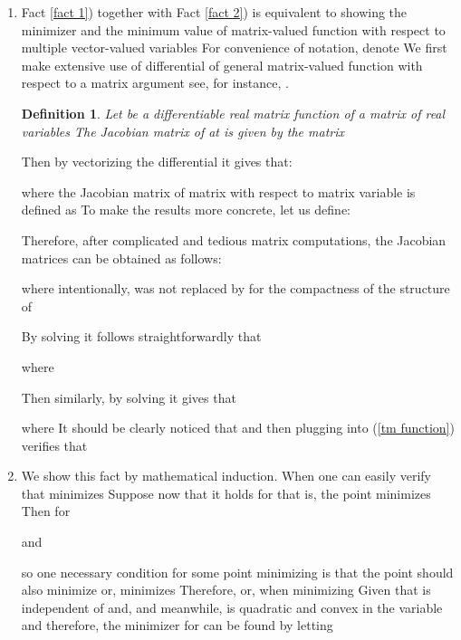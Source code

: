 \documentclass[journal]{IEEEtran}
\newtheorem{definition}{Definition}
\begin{document}
\begin{IEEEproof}



\begin{enumerate}
\item\label{proof1} Fact \ref{fact 1}) together with Fact \ref{fact 2}) is equivalent to showing the minimizer and the minimum value of matrix-valued function  with respect to multiple vector-valued variables  For convenience of notation, denote  We first make extensive use of differential of general matrix-valued function  with respect to a matrix argument  see, for instance, \cite{tif2009payaro}. \newline
    \begin{definition}
    Let  be a differentiable  real matrix function of a  matrix of real variables  The {\emph{Jacobian matrix}} of  at  is given by the  matrix
    
    \end{definition}

    \iffalse With slightly abuse of notation, we omit the notation  for brevity. For example, let  \fi
    Then by vectorizing the differential  it gives that:
    
    where the Jacobian matrix of matrix  with respect to matrix variable  is defined as   To make the results more concrete, let us define:
    
Therefore, after complicated and tedious matrix computations, the Jacobian matrices can be obtained as follows:
    
    where intentionally,  was not replaced by  for the compactness of the structure of 

    By solving  it follows straightforwardly that
    
    where 

    Then similarly, by solving  it gives that
    
    where  It should be clearly noticed that   and then plugging  into
    (\ref{tm function}) verifies that 

    \item We show this fact by mathematical induction. When  one can easily verify that  minimizes 
        Suppose now that it holds for  that is, the point  minimizes  Then for 
    
    and
    
    so one necessary condition for some point  minimizing  is that the point should also minimize 
    or,  minimizes  Therefore,  or,  when minimizing  Given that  is independent of  and,  and meanwhile,  is quadratic and convex in the variable  and therefore, the minimizer for  can be found by letting
    

\end{enumerate}
\end{IEEEproof}
\end{document}
